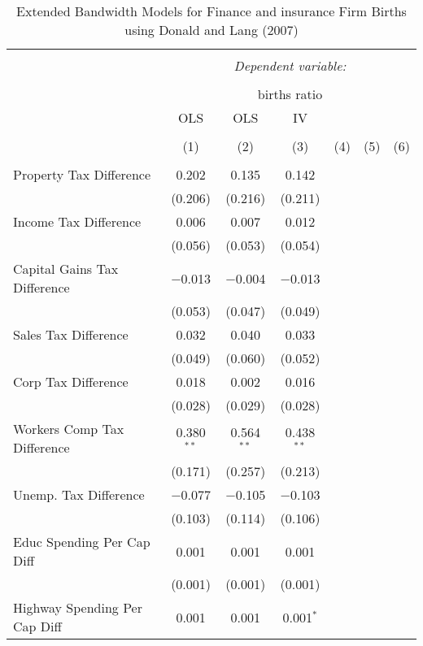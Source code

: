 
\begin{table}[!htbp] \centering 
  \caption{Extended Bandwidth Models for  Finance and insurance Firm Births using Donald and Lang (2007)} 
  \label{} 
\begin{tabular}{@{\extracolsep{5pt}}lcccccc} 
\\[-1.8ex]\hline 
\hline \\[-1.8ex] 
 & \multicolumn{6}{c}{\textit{Dependent variable:}} \\ 
\cline{2-7} 
\\[-1.8ex] & \multicolumn{6}{c}{births ratio} \\ 
 & OLS & OLS & IV &  &  &  \\ 
\\[-1.8ex] & (1) & (2) & (3) & (4) & (5) & (6)\\ 
\hline \\[-1.8ex] 
 Property Tax Difference & 0.202 & 0.135 & 0.142 &  &  &  \\ 
  & (0.206) & (0.216) & (0.211) &  &  &  \\ 
  Income Tax Difference & 0.006 & 0.007 & 0.012 &  &  &  \\ 
  & (0.056) & (0.053) & (0.054) &  &  &  \\ 
  Capital Gains Tax Difference & $-$0.013 & $-$0.004 & $-$0.013 &  &  &  \\ 
  & (0.053) & (0.047) & (0.049) &  &  &  \\ 
  Sales Tax Difference & 0.032 & 0.040 & 0.033 &  &  &  \\ 
  & (0.049) & (0.060) & (0.052) &  &  &  \\ 
  Corp Tax Difference & 0.018 & 0.002 & 0.016 &  &  &  \\ 
  & (0.028) & (0.029) & (0.028) &  &  &  \\ 
  Workers Comp Tax Difference & 0.380$^{**}$ & 0.564$^{**}$ & 0.438$^{**}$ &  &  &  \\ 
  & (0.171) & (0.257) & (0.213) &  &  &  \\ 
  Unemp. Tax Difference & $-$0.077 & $-$0.105 & $-$0.103 &  &  &  \\ 
  & (0.103) & (0.114) & (0.106) &  &  &  \\ 
  Educ Spending Per Cap Diff & 0.001 & 0.001 & 0.001 &  &  &  \\ 
  & (0.001) & (0.001) & (0.001) &  &  &  \\ 
  Highway Spending Per Cap Diff & 0.001 & 0.001 & 0.001$^{*}$ &  &  &  \\ 

\end{tabular}
\end{table}
